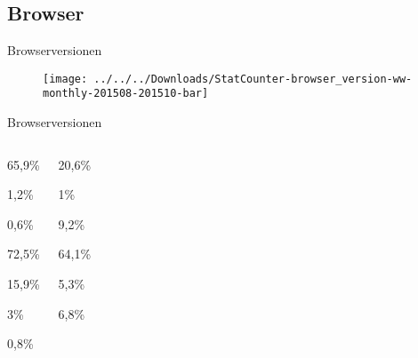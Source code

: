 \documentclass{beamer}
\begin{document}
	\subsection[Browser]{Browser}
	\begin{frame}[t]{Browserversionen}
		\begin{figure}
\centering
\texttt{[image: ../../../Downloads/StatCounter-browser\_version-ww-monthly-201508-201510-bar]}
\label{fig:StatCounter-browser_version-ww-monthly-201508-201510-bar}
\end{figure}

	\end{frame}
	\begin{frame}[t]{Browserversionen}
		\begin{columns}
				\begin{description}	
				\item<1->[Google Chrome] 65,9\%
				\begin{description}
					\item<1->[4.7] 1,2\%
					\item<1->[4.6] 0,6\%
					\item<1->[4.5] 72,5\%
					\item<1->[4.4] 15,9\%
					\item<1->[4.3] 3\%
					\item<1->[4.2] 0,8\%
				\end{description}
			\end{description}
				\column{0.5\textwidth}
				\begin{description}
				\item<2->[Firefox] 20,6\%
					\begin{description}
						\item<2->[FF 42] 1\%
						\item<2->[FF 41] 9,2\%
						\item<2->[FF 40] 64,1\%
						\item<2->[FF 39] 5,3\%
						\item<2->[FF 38] 6,8\%
					\end{description}
				\end{description}
			\end{columns}
		\end{frame}
\end{document}
